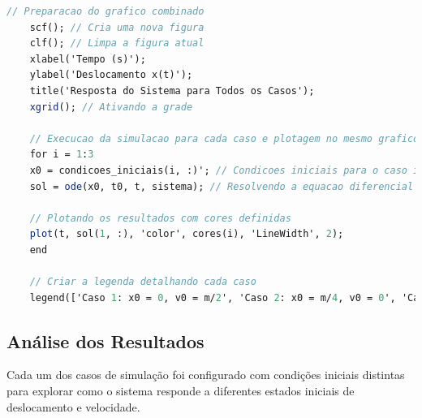 \begin{lstlisting}[language=Scilab, caption=Código Scilab para simular a resposta do sistema massa-mola-amortecedor]
    // Preparacao do grafico combinado
    scf(); // Cria uma nova figura
    clf(); // Limpa a figura atual
    xlabel('Tempo (s)');
    ylabel('Deslocamento x(t)');
    title('Resposta do Sistema para Todos os Casos');
    xgrid(); // Ativando a grade

    // Execucao da simulacao para cada caso e plotagem no mesmo grafico
    for i = 1:3
    x0 = condicoes_iniciais(i, :)'; // Condicoes iniciais para o caso i (transposto para coluna)
    sol = ode(x0, t0, t, sistema); // Resolvendo a equacao diferencial

    // Plotando os resultados com cores definidas
    plot(t, sol(1, :), 'color', cores(i), 'LineWidth', 2);
    end

    // Criar a legenda detalhando cada caso
    legend(['Caso 1: x0 = 0, v0 = m/2', 'Caso 2: x0 = m/4, v0 = 0', 'Caso 3: x0 = m/5, v0 = m/3'], "location", "best");
\end{lstlisting}

\subsection{Análise dos Resultados}
Cada um dos casos de simulação foi configurado com condições iniciais distintas para explorar como o sistema responde a diferentes estados iniciais de deslocamento e velocidade.

